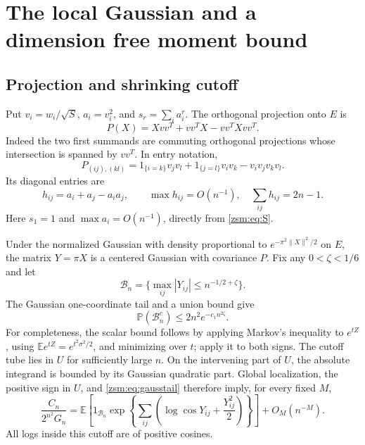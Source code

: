 \documentclass[11pt]{article}
\theoremstyle{definition}\newtheorem{definition}[theorem]{Definition}
\theoremstyle{remark}\newtheorem{remark}[theorem]{Remark}
\newcommand{\E}{\mathbb E}
\newcommand{\Prob}{\mathbb P}
\begin{document}
\section{The local Gaussian and a dimension free moment bound}\label{zsm:sec:gaussian}
\subsection{Projection and shrinking cutoff}
Put $v_i=w_i/\sqrt S$, $a_i=v_i^2$, and $s_r=\sum_i a_i^r$. The orthogonal
projection onto $E$ is
\begin{equation}\label{zsm:eq:Paction}
 P(X)=Xvv^T+vv^TX-vv^TXvv^T.
\end{equation}
Indeed the two first summands are commuting orthogonal projections whose
intersection is spanned by $vv^T$. In entry notation,
\begin{equation}\label{zsm:eq:P}
 P_{(ij),(kl)}=1_{\{i=k\}}v_jv_l+1_{\{j=l\}}v_iv_k-v_iv_jv_kv_l.
\end{equation}
Its diagonal entries are
\begin{equation}\label{zsm:eq:h}
 h_{ij}=a_i+a_j-a_ia_j,\qquad \max h_{ij}=O(n^{-1}),\quad
 \sum_{ij}h_{ij}=2n-1.
\end{equation}
Here $s_1=1$ and $\max a_i=O(n^{-1})$, directly from \eqref{zsm:eq:S}.

Under the normalized Gaussian with density proportional to
$e^{-\pi^2\|X\|^2/2}$ on $E$, the matrix $Y=\pi X$ is a centered Gaussian with
covariance $P$. Fix any $0<\zeta<1/6$ and let
\[
 \mathcal B_n=\{\max_{ij}|Y_{ij}|\le n^{-1/2+\zeta}\}.
\]
The Gaussian one-coordinate tail and a union bound give
\begin{equation}\label{zsm:eq:gausstail}
 \Prob(\mathcal B_n^c)\le2n^2e^{-c_1n^{2\zeta}}.
\end{equation}
For completeness, the scalar bound follows by applying Markov's inequality to
$e^{tZ}$, using $\E e^{tZ}=e^{t^2\sigma^2/2}$, and minimizing over $t$; apply
it to both signs. The cutoff tube lies in $U$ for sufficiently large $n$.
On the intervening part of $U$, the absolute integrand is bounded by its
Gaussian quadratic part. Global localization, the positive sign in $U$, and
\eqref{zsm:eq:gausstail} therefore imply, for every fixed $M$,
\begin{equation}\label{zsm:eq:Gaussianreduction}
 \frac{C_n}{2^{n^2}G_n}=
 \E\left[1_{\mathcal B_n}
  \exp\left\{\sum_{ij}\left(\log\cos Y_{ij}+\frac{Y_{ij}^2}2\right)\right\}\right]
 +O_M(n^{-M}).
\end{equation}
All logs inside this cutoff are of positive cosines.
\end{document}

